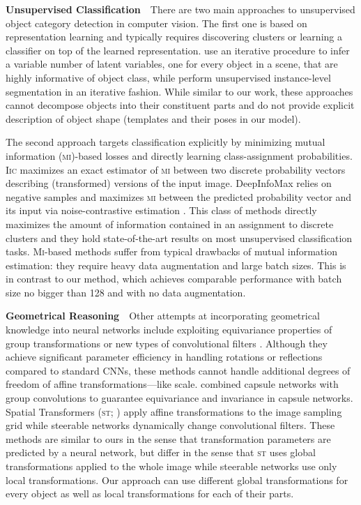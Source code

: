 \textbf{Unsupervised Classification}\ \ 
There are two main approaches to unsupervised object category detection in computer vision.
The first one is based on representation learning and typically requires discovering clusters or learning a classifier on top of the learned representation.
\cite{Eslami2016air,Kosiorek2018sqair} use an iterative procedure to infer a variable number of latent variables, one for every object in a scene, that are highly informative of object class, while \cite{Greff2019multi,Burgess2019monet} perform unsupervised instance-level segmentation in an iterative fashion.
While similar to our work, these approaches cannot decompose objects into their constituent parts and do not provide explicit description of object shape (\!\eg templates and their poses in our model).

The second approach targets classification explicitly by minimizing mutual information (\textsc{mi})-based losses and directly learning class-assignment probabilities.
\textsc{Iic} \citep{Ji2018iic} maximizes an exact estimator of \textsc{mi} between two discrete probability vectors describing (transformed) versions of the input image.
DeepInfoMax \citep{Hjelm2019deepinfomax} relies on negative samples and maximizes \textsc{mi} between the predicted probability vector and its input via noise-contrastive estimation \citep{Gutmann2010nce}.
This class of methods directly maximizes the amount of information contained in an assignment to discrete clusters and they hold state-of-the-art results on most unsupervised classification tasks.
\textsc{Mi}-based methods suffer from typical drawbacks of mutual information estimation: they require heavy data augmentation and large batch sizes.
This is in contrast to our method, which achieves comparable performance with batch size no bigger than 128 and with no data augmentation.

\textbf{Geometrical Reasoning}\ \ 
Other attempts at incorporating geometrical knowledge into neural networks include exploiting equivariance properties of group transformations \citep{Cohen2016group} or new types of convolutional filters \citep{Oyallon2015deep,Kocvok2016cyclic}.
Although they achieve significant parameter efficiency in handling rotations or reflections compared to standard \glspl{CNN}, these methods cannot handle additional degrees of freedom of affine transformations---like scale. \cite{Lenssen2018group} combined capsule networks with group convolutions to  guarantee equivariance and invariance in capsule networks.
Spatial Transformers (\textsc{st}; \cite{Jaderberg2015}) apply affine transformations to the image sampling grid while steerable networks \citep{Cohen2016steerable,Jacobsen2017dynamic} dynamically change convolutional filters.
These methods are similar to ours in the sense that transformation parameters are predicted by a neural network, but differ in the sense that \textsc{st} uses global transformations applied to the whole image while steerable networks use only local transformations.
Our approach can use different global transformations for every object as well as local transformations for each of their parts.
